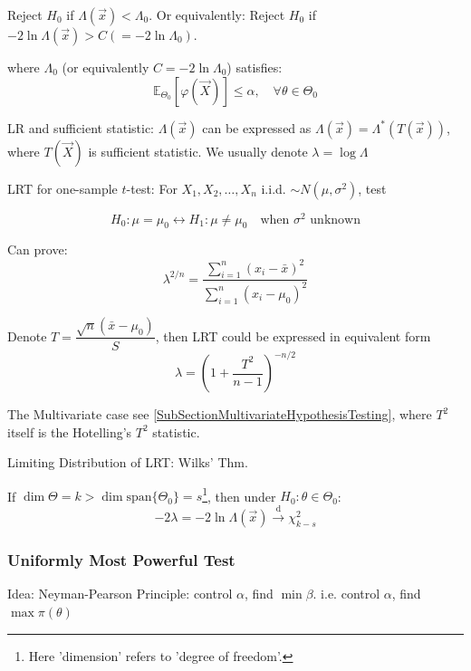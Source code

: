     Reject $H_0$ if $\Lambda(\vec{x})<\Lambda_0$. Or equivalently: Reject $H_0$ if $-2\ln\Lambda(\vec{x})>C(=-2\ln\Lambda_0)$.

    where $\Lambda_0$ (or equivalently $C=-2\ln\Lambda_0$) satisfies:
    \begin{equation}\mathbb{E}_{\Theta_0}[\varphi(\vec{X})]\leq\alpha,\quad\forall\theta\in\Theta_0\end{equation}

    LR and sufficient statistic: $\Lambda(\vec{x})$ can be expressed as $\Lambda(\vec{x})=\Lambda^*(T(\vec{x}))$, where $T(\vec{X})$ is sufficient statistic. We usually denote $ \lambda =\log \Lambda  $


\begin{point}
    LRT for one-sample $ t $-test: For $ X_1,X_2,\ldots,X_n $ i.i.d. $ \sim N(\mu,\sigma ^2) $, test

\[
    H_0: \mu=\mu_0\longleftrightarrow H_1:\mu\neq\mu_0\quad\text{when }\sigma ^2\text{ unknown}
\]

    Can prove:
    \[
        \lambda ^{2/n}=\dfrac{\sum\limits_{i=1}^n(x_i-\bar{x})^2}{\sum\limits_{i=1}^n(x_i-\mu_0)^2} 
    \]
    
    Denote $ T=\dfrac{\sqrt{n}(\bar{x}-\mu_0)}{S}$, then LRT could be expressed in equivalent form 
    \[
        \lambda  = \left( 1+\dfrac{T^2}{n-1} \right)^{-n/2}
    \]
    
    The Multivariate case see {\autoref{SubSectionMultivariateHypothesisTesting}}, where $ T^2 $ itself is the Hotelling's $ T^2 $ statistic.
    
    

\end{point}



\begin{point}
    Limiting Distribution of LRT: Wilks' Thm.
\end{point}

    

    
    If $\dim\Theta=k>\dim\mathrm{span}\{\Theta_0\}=s$\footnote{Here 'dimension' refers to 'degree of freedom'.}, then under $H_0:\theta\in\Theta_0$:
    \begin{equation}
        -2\lambda =-2\ln \Lambda (\vec{x})\xrightarrow[]{\mathrm{d}}\chi_{k-s}^2
    \end{equation}

\subsubsection{Uniformly Most Powerful Test}\label{SUbSectionUMP}
    Idea: Neyman-Pearson Principle: control $\alpha$, find $\min\beta$. i.e. control $\alpha$, find $\max\pi(\theta)$

